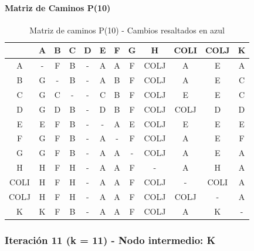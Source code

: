 \documentclass[12pt]{article}
\begin{document}
\paragraph{Matriz de Caminos P(10)}
\begin{table}[h!]
\centering
\begin{tabular}{|c|c|c|c|c|c|c|c|c|c|c|c|}
\hline
 & A & B & C & D & E & F & G & H & COLI & COLJ & K \\\hline
A & - & F & B & - & A & A & F & \cellcolor{lightblue} COLJ & A & E & A \\\hline
B & G & - & B & - & A & B & F & \cellcolor{lightblue} COLJ & A & E & C \\\hline
C & G & C & - & - & C & B & F & \cellcolor{lightblue} COLJ & E & E & C \\\hline
D & G & D & B & - & D & B & F & \cellcolor{lightblue} COLJ & \cellcolor{lightblue} COLJ & D & D \\\hline
E & E & F & B & - & - & A & E & \cellcolor{lightblue} COLJ & E & E & E \\\hline
F & G & F & B & - & A & - & F & \cellcolor{lightblue} COLJ & A & E & F \\\hline
G & G & F & B & - & A & A & - & \cellcolor{lightblue} COLJ & A & E & A \\\hline
H & H & F & H & - & A & A & F & - & A & H & A \\\hline
COLI & \cellcolor{lightblue} H & \cellcolor{lightblue} F & \cellcolor{lightblue} H & - & \cellcolor{lightblue} A & \cellcolor{lightblue} A & \cellcolor{lightblue} F & \cellcolor{lightblue} COLJ & - & COLI & \cellcolor{lightblue} A \\\hline
COLJ & H & F & H & - & A & A & F & COLJ & COLJ & - & A \\\hline
K & K & F & B & - & A & A & F & \cellcolor{lightblue} COLJ & A & K & - \\\hline
\end{tabular}
\caption{Matriz de caminos P(10) - Cambios resaltados en azul}
\end{table}

\subsubsection{Iteración 11 (k = 11) - Nodo intermedio: K}
\end{document}
